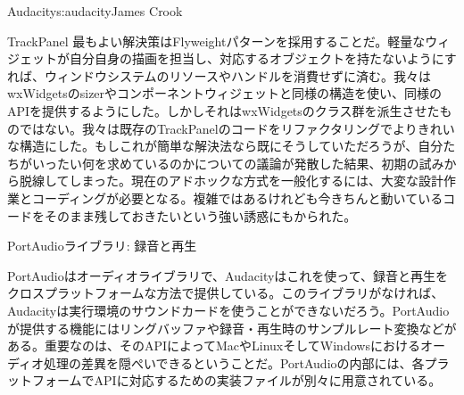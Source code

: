\begin{aosachapter}{Audacity}{s:audacity}{James Crook}
\begin{aosasect1}{TrackPanel}
最もよい解決策はFlyweightパターンを採用することだ。軽量なウィジェットが自分自身の描画を担当し、対応するオブジェクトを持たないようにすれば、ウィンドウシステムのリソースやハンドルを消費せずに済む。我々はwxWidgetsのsizerやコンポーネントウィジェットと同様の構造を使い、同様のAPIを提供するようにした。しかしそれはwxWidgetsのクラス群を派生させたものではない。我々は既存のTrackPanelのコードをリファクタリングでよりきれいな構造にした。もしこれが簡単な解決法なら既にそうしていただろうが、自分たちがいったい何を求めているのかについての議論が発散した結果、初期の試みから脱線してしまった。現在のアドホックな方式を一般化するには、大変な設計作業とコーディングが必要となる。複雑ではあるけれども今きちんと動いているコードをそのまま残しておきたいという強い誘惑にもかられた。

\end{aosasect1}

\begin{aosasect1}{PortAudioライブラリ: 録音と再生}

PortAudioはオーディオライブラリで、Audacityはこれを使って、録音と再生をクロスプラットフォームな方法で提供している。このライブラリがなければ、Audacityは実行環境のサウンドカードを使うことができないだろう。PortAudioが提供する機能にはリングバッファや録音・再生時のサンプルレート変換などがある。重要なのは、そのAPIによってMacやLinuxそしてWindowsにおけるオーディオ処理の差異を隠ぺいできるということだ。PortAudioの内部には、各プラットフォームでAPIに対応するための実装ファイルが別々に用意されている。


\end{aosasect1}
\end{aosachapter}
